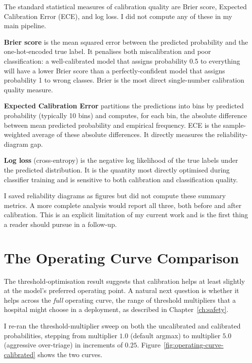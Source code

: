 \begin{notebox}
The standard statistical measures of calibration quality are Brier score, Expected Calibration Error (ECE), and log loss. I did not compute any of these in my main pipeline.

\textbf{Brier score} is the mean squared error between the predicted probability and the one-hot-encoded true label. It penalises both miscalibration and poor classification: a well-calibrated model that assigns probability 0.5 to everything will have a lower Brier score than a perfectly-confident model that assigns probability 1 to wrong classes. Brier is the most direct single-number calibration quality measure.

\textbf{Expected Calibration Error} partitions the predictions into bins by predicted probability (typically 10 bins) and computes, for each bin, the absolute difference between mean predicted probability and empirical frequency. ECE is the sample-weighted average of these absolute differences. It directly measures the reliability-diagram gap.

\textbf{Log loss} (cross-entropy) is the negative log likelihood of the true labels under the predicted distribution. It is the quantity most directly optimised during classifier training and is sensitive to both calibration and classification quality.

I saved reliability diagrams as figures but did not compute these summary metrics. A more complete analysis would report all three, both before and after calibration. This is an explicit limitation of my current work and is the first thing a reader should pursue in a follow-up.
\end{notebox}

\section{The Operating Curve Comparison}

The threshold-optimisation result suggests that calibration helps at least slightly at the model's preferred operating point. A natural next question is whether it helps across the \emph{full} operating curve, the range of threshold multipliers that a hospital might choose in a deployment, as described in Chapter~\ref{ch:safety}.

I re-ran the threshold-multiplier sweep on both the uncalibrated and calibrated probabilities, stepping from multiplier $1.0$ (default argmax) to multiplier $5.0$ (aggressive over-triage) in increments of $0.25$. Figure~\ref{fig:operating-curve-calibrated} shows the two curves.

